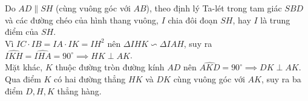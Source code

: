 \begin{bt}
{\begin{enumerate}[a)]
	Do $AD \parallel SH$ (cùng vuông góc với $AB$), theo định lý Ta-lét trong tam giác $SBD$ và các đường chéo của hình thang vuông, $I$ chia đôi đoạn $SH$, hay $I$ là trung điểm của $SH$.\\
	Vì $IC \cdot IB = IA \cdot IK = IH^2$ nên $\Delta IHK \backsim \Delta IAH$, suy ra $\widehat{IKH} = \widehat{IHA} = 90^\circ \implies HK \perp AK$.\\
	Mặt khác, $K$ thuộc đường tròn đường kính $AD$ nên $\widehat{AKD} = 90^\circ \implies DK \perp AK$.\\
	Qua điểm $K$ có hai đường thẳng $HK$ và $DK$ cùng vuông góc với $AK$, suy ra ba điểm $D, H, K$ thẳng hàng.
\end{enumerate}
}
\end{bt}
